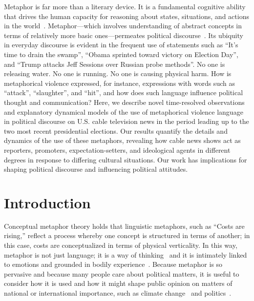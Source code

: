 Metaphor is far more than a literary device. It is a
fundamental cognitive ability that drives the human capacity for reasoning about
states, situations, and actions in the world~\cite{Gibbs1994,Lakoff1980}.
Metaphor---which involves understanding of abstract concepts in
terms of relatively more basic ones---permeates political
discourse~\cite{Lakoff2008,Matlock2012}. Its ubiquity in everyday discourse
is evident in the frequent use of statements such as ``It's time
to drain the swamp'', ``Obama sprinted toward victory on Election Day'', and
``Trump attacks Jeff Sessions over Russian probe methods''. No one is releasing
water. No one is running. No one is causing physical harm. How is metaphorical
violence expressed, for instance, expressions with words such as ``attack'',
``slaughter'', and ``hit'', and how does such language influence political
thought and communication? Here, we describe novel time-resolved 
observations and explanatory dynamical models of the use of metaphorical 
violence language in political discourse on U.S. cable television news in the 
period leading up to the two most recent presidential elections. 
Our results quantify the details and dynamics of the use of these metaphors, 
revealing how cable news shows act as reporters, promoters, 
expectation-setters, and ideological agents in different degrees in 
response to differing cultural situations. Our work has implications for 
shaping political discourse and influencing political attitudes. 	

\section{Introduction}

Conceptual metaphor theory holds that linguistic
metaphors, such as ``Costs are rising,'' reflect a process whereby one concept is
structured in terms of another; in this case, costs are conceptualized in terms
of physical verticality. In this way, metaphor is not just language; it is a way
of thinking~\cite{Gibbs1994,Lakoff1980,Thibodeau2011}  and it is intimately
linked to emotions \cite{Kovecses2010} and grounded in bodily
experience~\cite{Gallese2005}. Because metaphor is so pervasive and because many
people care about political matters, it is useful to consider how it is used and
how it might shape public opinion on matters of national or international
importance, such as climate change~\cite{Flusberg2017} and
politics~\cite{Lakoff2008,Lakoff2012}. 

